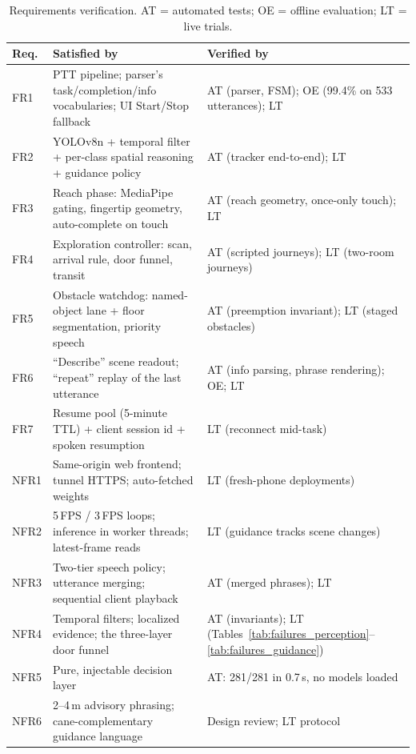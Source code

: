 \begin{table}[!htbp]
\centering
\caption[Requirements verification]{Requirements verification. AT = automated
tests; OE = offline evaluation; LT = live trials.}
\label{tab:req_eval}
\small
\begin{tabular}{p{1.2cm} p{6.4cm} p{5.4cm}}
\toprule
\textbf{Req.} & \textbf{Satisfied by} & \textbf{Verified by} \\
\midrule
FR1 & PTT pipeline; parser's task/completion/info vocabularies; UI Start/Stop fallback & AT (parser, FSM); OE (99.4\% on 533 utterances); LT \\
FR2 & YOLOv8n + temporal filter + per-class spatial reasoning + guidance policy & AT (tracker end-to-end); LT \\
FR3 & Reach phase: MediaPipe gating, fingertip geometry, auto-complete on touch & AT (reach geometry, once-only touch); LT \\
FR4 & Exploration controller: scan, arrival rule, door funnel, transit & AT (scripted journeys); LT (two-room journeys) \\
FR5 & Obstacle watchdog: named-object lane + floor segmentation, priority speech & AT (preemption invariant); LT (staged obstacles) \\
FR6 & ``Describe'' scene readout; ``repeat'' replay of the last utterance & AT (info parsing, phrase rendering); OE; LT \\
FR7 & Resume pool (5-minute TTL) + client session id + spoken resumption & LT (reconnect mid-task) \\
\midrule
NFR1 & Same-origin web frontend; tunnel HTTPS; auto-fetched weights & LT (fresh-phone deployments) \\
NFR2 & 5\,FPS / 3\,FPS loops; inference in worker threads; latest-frame reads & LT (guidance tracks scene changes) \\
NFR3 & Two-tier speech policy; utterance merging; sequential client playback & AT (merged phrases); LT \\
NFR4 & Temporal filters; localized evidence; the three-layer door funnel & AT (invariants); LT (Tables~\ref{tab:failures_perception}--\ref{tab:failures_guidance}) \\
NFR5 & Pure, injectable decision layer & AT: 281/281 in 0.7\,s, no models loaded \\
NFR6 & 2--4\,m advisory phrasing; cane-complementary guidance language & Design review; LT protocol \\
\bottomrule
\end{tabular}
\end{table}

